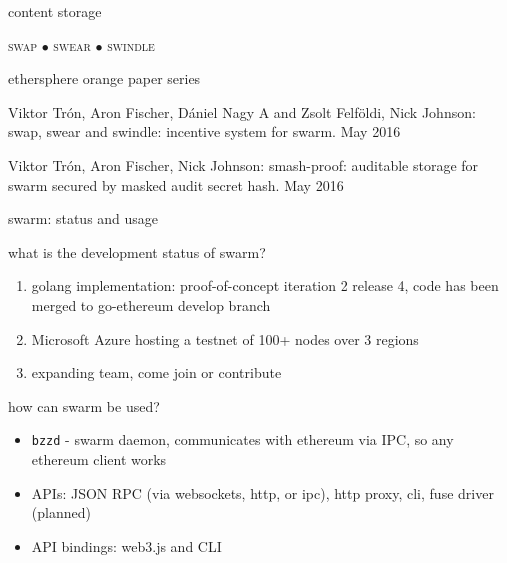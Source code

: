 \documentclass{beamer}
\begin{document}
\begin{section}{content storage}
\begin{frame}
 \begin{center}
 \textsc{ swap $\bullet$ swear $\bullet$ swindle }
 \end{center}
\end{frame}

\begin{frame}{ethersphere orange paper series}
 \begin{block}{}
Viktor Trón, Aron Fischer, Dániel Nagy A and Zsolt Felföldi, Nick Johnson: swap, swear and swindle: incentive system for swarm. May 2016
\end{block}
 \begin{block}{}
Viktor Trón, Aron Fischer, Nick Johnson: smash-proof: auditable storage for swarm secured by masked audit secret hash. May 2016
 \end{block}
\end{frame}

\end{section}

\begin{frame}{swarm: status and usage}
\begin{block}{what is the development status of swarm?}
\begin{enumerate}
\item golang implementation: proof-of-concept iteration 2 release 4, code has been merged to go-ethereum develop branch
\item Microsoft Azure hosting a testnet of 100+ nodes over 3 regions
\item expanding team, come join or contribute
\end{enumerate}
\end{block}

\begin{block}{how can swarm be used?}
\begin{itemize}
\item \texttt{bzzd} - swarm daemon, communicates with ethereum via IPC, so any ethereum client works
\item APIs: JSON RPC (via websockets, http, or ipc), http proxy, cli, fuse driver (planned)
\item API bindings: web3.js and CLI
\end{itemize}
\end{block}

\end{frame}
\end{document}
